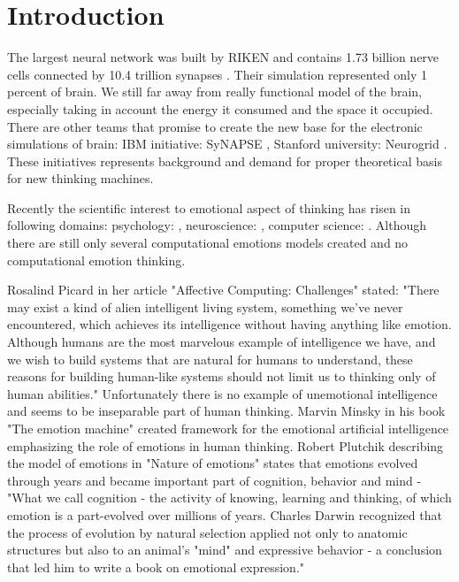 \section{Introduction}

The largest neural network was built by RIKEN and contains 1.73 billion nerve cells connected by 10.4 trillion synapses \cite{RIKEN}. Their simulation represented only 1 percent of brain. We still far away from really functional model of the brain, especially taking in account the energy it consumed and the space it occupied. There are other teams that promise to create the new base for the electronic simulations of brain: IBM initiative: SyNAPSE \cite{SyNAPSE}, Stanford university: Neurogrid \cite{Neurogrid}. These initiatives represents background and demand for proper theoretical basis for new thinking machines.

Recently the scientific interest to emotional aspect of thinking has risen in following domains: psychology: \cite{natureofemotions, appraisal_determinants_of_emotions, appraisal_considered_as_a_process, putting_appraisal_in_context, sex_differencies}, neuroscience: \cite{emotionsbraintorobot, parsingreward, neuromodulatory, cubeofemotions, natureofemotions, putting_appraisal_in_context, anatomic}, computer science: \cite{intelligent_machinery, emotionandsociable, senticcomputing, hourglass, affectivemodelofinterplay, affectivecomputing, dont_worry_be_happy, hourglass, senticcomputing, parsingreward, emotionsbraintorobot, motivationalrewardframework, roleofemotions, computationalmodelsemotionscognition}. Although there are still only several computational emotions models created \cite{computationalmodelsemotion, computationalmodelsemotionscognition, evaluatingcomutationalmodel, threelevel} and no computational emotion thinking.

Rosalind Picard in her article "Affective Computing: Challenges" \cite{affectivecomputingchallanges} stated: "There may exist a kind of alien intelligent living system, something we've never encountered, which achieves its intelligence without having anything like emotion. Although humans are the most marvelous example of intelligence we have, and we wish to build systems that are natural for humans to understand, these reasons for building human-like systems should not limit us to thinking only of human abilities." Unfortunately there is no example of unemotional intelligence and seems to be inseparable part of human thinking. Marvin Minsky in his book "The emotion machine" \cite{emotionmachine} created framework for the emotional artificial intelligence emphasizing the role of emotions in human thinking. Robert Plutchik describing the model of emotions in "Nature of emotions" \cite{natureofemotions} states that emotions evolved through years and became important part of cognition, behavior and mind - "What we call cognition - the activity of knowing, learning and thinking, of which emotion is a part-evolved over millions of years. Charles Darwin recognized that the process of evolution by natural selection applied not only to anatomic structures but also to an animal’s "mind" and expressive behavior - a conclusion that led him to write a book on emotional expression."

